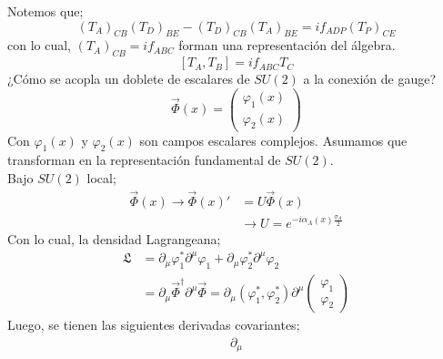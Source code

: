 \documentclass[../main.tex]{subfiles}
\begin{document}
 Notemos que;
 \begin{equation}
   (T_A)_{CB} (T_D)_{BE} -(T_D)_{CB} (T_A)_{BE} = if_{ADP} (T_P)_{CE}
  \end{equation}
  con lo cual, $(T_A)_{CB} = if_{ABC}$ forman una representación del álgebra. 
  \begin{equation}
    \left[ T_A,T_B \right] = if_{ABC}T_C
   \end{equation}
   ¿Cómo se acopla un doblete de escalares de $SU(2)$ a la conexión de gauge?
   \begin{equation}
     \vec{\Phi}(x) = \begin{pmatrix}
       \varphi_1(x) \\ \varphi_2(x)
     \end{pmatrix} 
    \end{equation}
Con $\varphi_1(x)$ y $\varphi_2(x)$ son campos escalares complejos. Asumamos que transforman en la representación fundamental de $SU(2)$.\\
Bajo $SU(2)$ local;
\begin{align*}
  \vec{\Phi}(x) \rightarrow \vec{\Phi}(x)' & = U\vec{\Phi}(x) \\
  & \rightarrow U = e^{-i\alpha_A(x)\frac{\sigma_A}{2}}
\end{align*}
Con lo cual, la densidad Lagrangeana;
\begin{align*}
  \mathfrak{L} & = \partial_\mu \varphi_1^* \partial^\mu \varphi_1 + \partial_\mu \varphi^*_2 \partial^\mu \varphi_2 \\
  & = \partial_\mu \vec{\Phi}^\dagger \partial^\mu \vec{\Phi} = \partial_\mu \left( \varphi^*_1, \varphi^*_2 \right) \partial^\mu \begin{pmatrix}
    \varphi_1 \\ \varphi_2
  \end{pmatrix}
\end{align*}
Luego, se tienen las siguientes derivadas covariantes;
\begin{align*}
   \partial_\mu
\end{align*}
 
\end{document}
